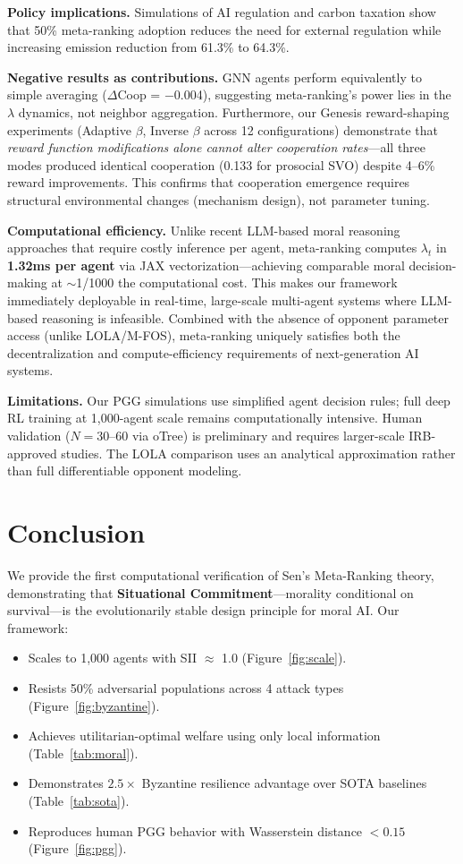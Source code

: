 \documentclass{article}
\begin{document}
\textbf{Policy implications.} Simulations of AI regulation and carbon taxation show that 50\% meta-ranking adoption reduces the need for external regulation while increasing emission reduction from 61.3\% to 64.3\%.

\textbf{Negative results as contributions.} GNN agents perform equivalently to simple averaging ($\Delta$Coop = $-$0.004), suggesting meta-ranking's power lies in the $\lambda$ dynamics, not neighbor aggregation. Furthermore, our Genesis reward-shaping experiments (Adaptive $\beta$, Inverse $\beta$ across 12 configurations) demonstrate that \textit{reward function modifications alone cannot alter cooperation rates}---all three modes produced identical cooperation (0.133 for prosocial SVO) despite 4--6\% reward improvements. This confirms that cooperation emergence requires structural environmental changes (mechanism design), not parameter tuning.

\textbf{Computational efficiency.} Unlike recent LLM-based moral reasoning approaches that require costly inference per agent, meta-ranking computes $\lambda_t$ in \textbf{1.32ms per agent} via JAX vectorization---achieving comparable moral decision-making at $\sim$1/1000 the computational cost. This makes our framework immediately deployable in real-time, large-scale multi-agent systems where LLM-based reasoning is infeasible. Combined with the absence of opponent parameter access (unlike LOLA/M-FOS), meta-ranking uniquely satisfies both the decentralization and compute-efficiency requirements of next-generation AI systems.

\textbf{Limitations.} Our PGG simulations use simplified agent decision rules; full deep RL training at 1,000-agent scale remains computationally intensive. Human validation ($N{=}30$--60 via oTree) is preliminary and requires larger-scale IRB-approved studies. The LOLA comparison uses an analytical approximation rather than full differentiable opponent modeling.

\section{Conclusion}

We provide the first computational verification of Sen's Meta-Ranking theory, demonstrating that \textbf{Situational Commitment}---morality conditional on survival---is the evolutionarily stable design principle for moral AI. Our framework:
\begin{itemize}
    \item Scales to 1,000 agents with SII $\approx$ 1.0 (Figure~\ref{fig:scale}).
    \item Resists 50\% adversarial populations across 4 attack types (Figure~\ref{fig:byzantine}).
    \item Achieves utilitarian-optimal welfare using only local information (Table~\ref{tab:moral}).
    \item Demonstrates $2.5\times$ Byzantine resilience advantage over SOTA baselines (Table~\ref{tab:sota}).
    \item Reproduces human PGG behavior with Wasserstein distance $< 0.15$ (Figure~\ref{fig:pgg}).
\end{itemize}
\end{document}
